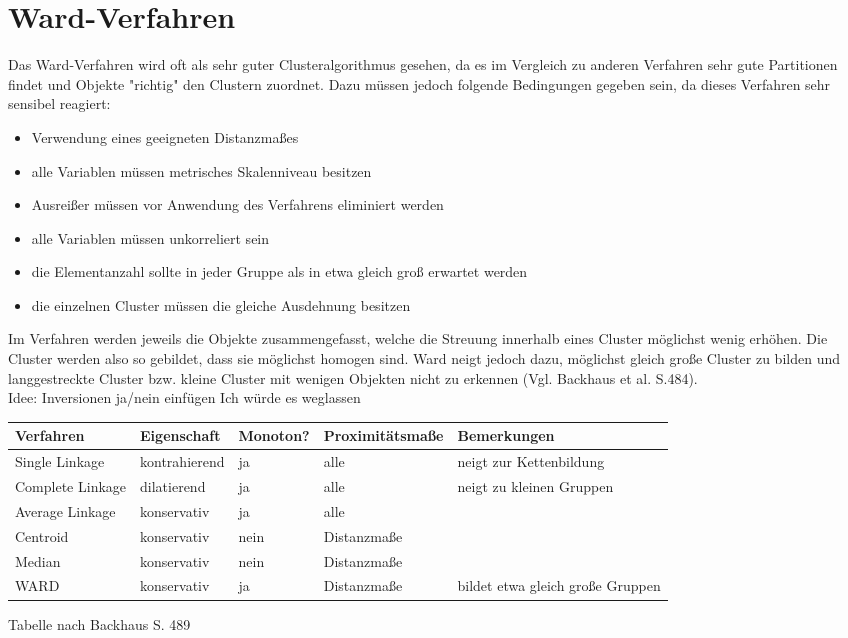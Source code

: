 \section{Ward-Verfahren}
Das Ward-Verfahren wird oft als sehr guter Clusteralgorithmus gesehen, da es im Vergleich zu anderen Verfahren sehr gute Partitionen findet und Objekte "richtig" den Clustern zuordnet. Dazu müssen jedoch folgende Bedingungen gegeben sein, da dieses Verfahren sehr sensibel reagiert: 

\begin{itemize}
	\item Verwendung eines geeigneten Distanzmaßes
	\item alle Variablen müssen metrisches Skalenniveau besitzen
	\item Ausreißer müssen vor Anwendung des Verfahrens eliminiert werden
	\item alle Variablen müssen unkorreliert sein
	\item die Elementanzahl sollte in jeder Gruppe als in etwa gleich groß erwartet werden
	\item die einzelnen Cluster müssen die gleiche Ausdehnung besitzen
\end{itemize}

Im Verfahren werden jeweils die Objekte zusammengefasst, welche die Streuung innerhalb eines Cluster möglichst wenig erhöhen. Die Cluster werden also so gebildet, dass sie möglichst homogen sind. Ward neigt jedoch dazu, möglichst gleich große Cluster zu bilden und langgestreckte Cluster bzw. kleine Cluster mit wenigen Objekten nicht zu erkennen (Vgl. Backhaus et al. \cite{Backhaus.2016} S.484). \\


Idee: Inversionen ja/nein einfügen Ich würde es weglassen\\
\begin{tabular}{|l|l|l|l|p{3.7cm}|}
	\hline
	\rowcolor{babyblueeyes}Verfahren & Eigenschaft & Monoton? & Proximitätsmaße & Bemerkungen \\ \hline
	\rowcolor{beaublue}Single Linkage & kontrahierend & ja & alle & neigt zur Kettenbildung \\ \hline
	\rowcolor{beaublue}Complete Linkage & dilatierend & ja & alle & neigt zu kleinen Gruppen \\ \hline	
	\rowcolor{beaublue}Average Linkage & konservativ & ja & alle & \\ \hline
	\rowcolor{beaublue}Centroid & konservativ & nein & Distanzmaße & \\ \hline
	\rowcolor{beaublue}Median & konservativ & nein & Distanzmaße & \\ \hline
	\rowcolor{beaublue}WARD & konservativ & ja & Distanzmaße & bildet etwa gleich große Gruppen \\ \hline
\end{tabular}
Tabelle nach Backhaus S. 489
